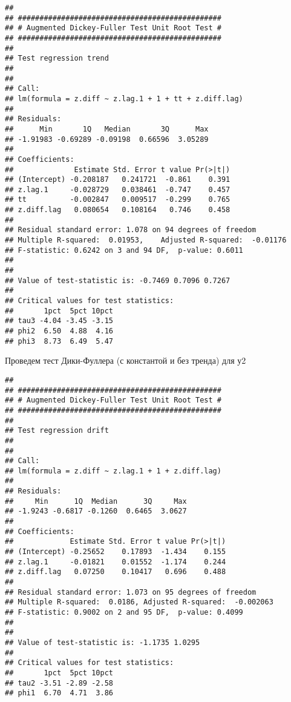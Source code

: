 \documentclass[
]{article}
\newenvironment{Shaded}{\begin{snugshade}}{\end{snugshade}}
\newcommand{\AttributeTok}[1]{\textcolor[rgb]{0.13,0.29,0.53}{#1}}
\newcommand{\FunctionTok}[1]{\textcolor[rgb]{0.13,0.29,0.53}{\textbf{#1}}}
\newcommand{\NormalTok}[1]{#1}
\newcommand{\SpecialCharTok}[1]{\textcolor[rgb]{0.81,0.36,0.00}{\textbf{#1}}}
\newcommand{\StringTok}[1]{\textcolor[rgb]{0.31,0.60,0.02}{#1}}
\begin{document}
\begin{verbatim}
## 
## ############################################### 
## # Augmented Dickey-Fuller Test Unit Root Test # 
## ############################################### 
## 
## Test regression trend 
## 
## 
## Call:
## lm(formula = z.diff ~ z.lag.1 + 1 + tt + z.diff.lag)
## 
## Residuals:
##      Min       1Q   Median       3Q      Max 
## -1.91983 -0.69289 -0.09198  0.66596  3.05289 
## 
## Coefficients:
##              Estimate Std. Error t value Pr(>|t|)
## (Intercept) -0.208187   0.241721  -0.861    0.391
## z.lag.1     -0.028729   0.038461  -0.747    0.457
## tt          -0.002847   0.009517  -0.299    0.765
## z.diff.lag   0.080654   0.108164   0.746    0.458
## 
## Residual standard error: 1.078 on 94 degrees of freedom
## Multiple R-squared:  0.01953,    Adjusted R-squared:  -0.01176 
## F-statistic: 0.6242 on 3 and 94 DF,  p-value: 0.6011
## 
## 
## Value of test-statistic is: -0.7469 0.7096 0.7267 
## 
## Critical values for test statistics: 
##       1pct  5pct 10pct
## tau3 -4.04 -3.45 -3.15
## phi2  6.50  4.88  4.16
## phi3  8.73  6.49  5.47
\end{verbatim}

Проведем тест Дики-Фуллера (с константой и без тренда) для у2

\begin{Shaded}
\end{Shaded}

\begin{verbatim}
## 
## ############################################### 
## # Augmented Dickey-Fuller Test Unit Root Test # 
## ############################################### 
## 
## Test regression drift 
## 
## 
## Call:
## lm(formula = z.diff ~ z.lag.1 + 1 + z.diff.lag)
## 
## Residuals:
##     Min      1Q  Median      3Q     Max 
## -1.9243 -0.6817 -0.1260  0.6465  3.0627 
## 
## Coefficients:
##             Estimate Std. Error t value Pr(>|t|)
## (Intercept) -0.25652    0.17893  -1.434    0.155
## z.lag.1     -0.01821    0.01552  -1.174    0.244
## z.diff.lag   0.07250    0.10417   0.696    0.488
## 
## Residual standard error: 1.073 on 95 degrees of freedom
## Multiple R-squared:  0.0186, Adjusted R-squared:  -0.002063 
## F-statistic: 0.9002 on 2 and 95 DF,  p-value: 0.4099
## 
## 
## Value of test-statistic is: -1.1735 1.0295 
## 
## Critical values for test statistics: 
##       1pct  5pct 10pct
## tau2 -3.51 -2.89 -2.58
## phi1  6.70  4.71  3.86
\end{verbatim}
\end{document}
